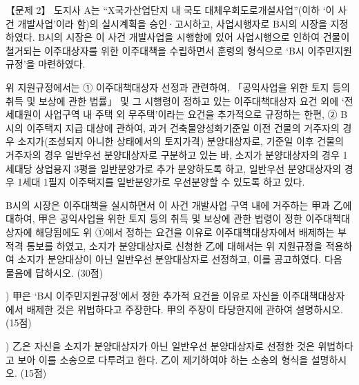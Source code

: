 \begin{longquestion}{【문제 2】}
도지사 A는 “X국가산업단지 내 국도 대체우회도로개설사업”(이하 ‘이 사건 개발사업’이라 함)의 실시계획을 승인·고시하고, 사업시행자로 B시의 시장을 지정하였다. B시의 시장은 이 사건 개발사업을 시행함에 있어 사업시행으로 인하여 건물이 철거되는 이주대상자를 위한 이주대책을 수립하면서 훈령의 형식으로 ‘B시 이주민지원규정’을 마련하였다. \par
위 지원규정에서는 ① 이주대책대상자 선정과 관련하여, 「공익사업을 위한 토지 등의 취득 및 보상에 관한 법률」 및 그 시행령이 정하고 있는 이주대책대상자 요건 외에 ‘전세대원이 사업구역 내 주택 외 무주택’이라는 요건을 추가적으로 규정하는 한편, ② B시의 이주택지 지급 대상에 관하여, 과거 건축물양성화기준일 이전 건물의 거주자의 경우 소지가(조성되지 아니한 상태에서의 토지가격) 분양대상자로, 기준일 이후 건물의 거주자의 경우 일반우선 분양대상자로 구분하고 있는 바, 소지가 분양대상자의 경우 1세대당 상업용지 3평을 일반분양가로 추가 분양하도록 하고, 일반우선 분양대상자의 경우 1세대 1필지 이주택지를 일반분양가로 우선분양할 수 있도록 하고 있다. \par
B시의 시장은 이주대책을 실시하면서 이 사건 개발사업 구역 내에 거주하는 甲과 乙에 대하여, 甲은 공익사업을 위한 토지 등의 취득 및 보상에 관한 법령이 정한 이주대책대상자에 해당됨에도 위 ①에서 정하는 요건을 이유로 이주대책대상자에서 배제하는 부적격 통보를 하였고, 소지가 분양대상자로 신청한 乙에 대해서는 위 지원규정을 적용하여 소지가 분양대상이 아닌 일반우선 분양대상자로 선정하고, 이를 공고하였다. 다음 물음에 답하시오. (30점) \par
\medskip{}) 甲은 ‘B시 이주민지원규정’에서 정한 추가적 요건을 이유로 자신을 이주대책대상자에서 배제한 것은 위법하다고 주장한다. 甲의 주장이 타당한지에 관하여 설명하시오. (15점) \par
\medskip{}) 乙은 자신을 소지가 분양대상자가 아닌 일반우선 분양대상자로 선정한 것은 위법하다고 보아 이를 소송으로 다투려고 한다. 乙이 제기하여야 하는 소송의 형식을 설명하시오. (15점) \par
\end{longquestion}
